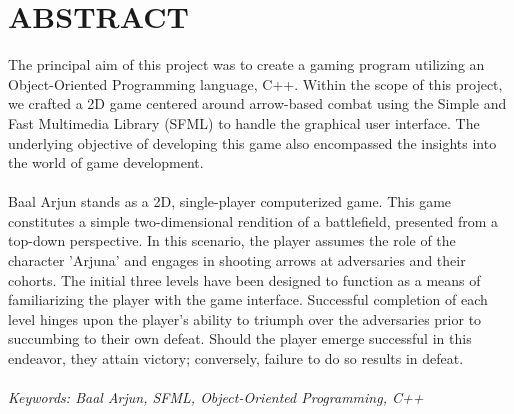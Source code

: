 

\newpage
\section*{ABSTRACT}

The principal aim of this project was to create a gaming program utilizing an Object-Oriented Programming language, C++. Within the scope of this project, we crafted a 2D game centered around arrow-based combat using the Simple and Fast Multimedia Library (SFML) to handle the graphical user interface. The underlying objective of developing this game also encompassed the insights into the world of game development.\\\\
Baal Arjun stands as a 2D, single-player computerized game. This game constitutes a simple two-dimensional rendition of a battlefield, presented from a top-down perspective. In this scenario, the player assumes the role of the character 'Arjuna' and engages in shooting arrows at adversaries and their cohorts. The initial three levels have been designed to function as a means of familiarizing the player with the game interface. Successful completion of each level hinges upon the player's ability to triumph over the adversaries prior to succumbing to their own defeat. Should the player emerge successful in this endeavor, they attain victory; conversely, failure to do so results in defeat.\\\\
\textit{Keywords: Baal Arjun, SFML, Object-Oriented Programming, C++}